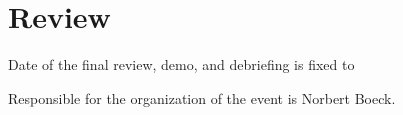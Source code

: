 
\section*{Review}

Date of the final review, demo, and debriefing is fixed to

\begin{center}
\end{center}

Responsible for the organization of the event is Norbert Boeck.




